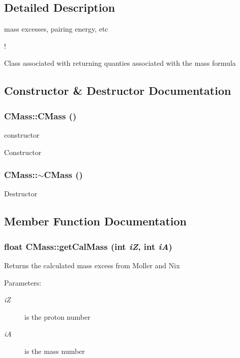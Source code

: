 \subsection{Detailed Description}
mass excesses, pairing energy, etc 

!

Class associated with returning quanties associated with the mass formula 



\subsection{Constructor \& Destructor Documentation}
\subsubsection{\setlength{\rightskip}{0pt plus 5cm}CMass::CMass ()\hspace{0.3cm}{\tt  [protected]}}\label{classCMass_2961afaaf4f193c19108d67a589072f3}


constructor 

Constructor 
\subsubsection{\setlength{\rightskip}{0pt plus 5cm}CMass::$\sim$CMass ()}\label{classCMass_ea23d00a8bcab0fd04aae37739509df0}


Destructor 

\subsection{Member Function Documentation}
\subsubsection{\setlength{\rightskip}{0pt plus 5cm}float CMass::get\-Cal\-Mass (int {\em i\-Z}, int {\em i\-A})}\label{classCMass_fd7aa662a139853822a373e3098bf3fa}


Returns the calculated mass excess from Moller and Nix

\begin{Desc}
\item[Parameters:]
\begin{description}
\item[{\em i\-Z}]is the proton number \item[{\em i\-A}]is the mass number \end{description}
\end{Desc}
